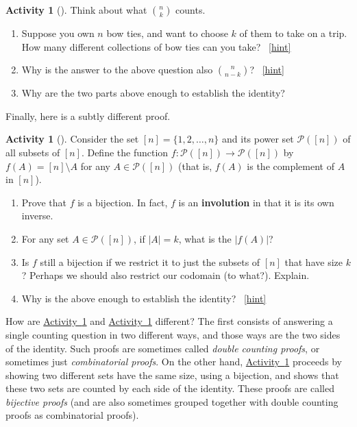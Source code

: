 \documentclass[10pt,]{book}
\newcommand{\terminology}[1]{\textbf{#1}}
\theoremstyle{plain}
\theoremstyle{definition}
\theoremstyle{definition}
\theoremstyle{definition}
\newtheorem{activity}[project]{Activity}
\numberwithin{equation}{chapter}
\def\pow{\mathcal P}
\newcommand{\card}[1]{\left| #1 \right|}
\begin{document}
\begin{activity}[]\label{act-pascalsym-dc}
\hypertarget{p-105}{}%
Think about what \(\binom{n}{k}\) counts.%
\begin{enumerate}[font=\bfseries,label=(\alph*),ref=\alph*]
\item\label{task-33} \hypertarget{p-106}{}%
Suppose you own \(n\) bow ties, and want to choose \(k\) of them to take on a trip.  How many different collections of bow ties can you take?%
~\hfill{\tiny\hyperlink{a-12.a}{[hint]}\hypertarget{q-12.a}{}}\item\label{task-34} \hypertarget{p-109}{}%
Why is the answer to the above question also \(\binom{n}{n-k}\)?%
~\hfill{\tiny\hyperlink{a-12.b}{[hint]}\hypertarget{q-12.b}{}}\item\label{task-35} \hypertarget{p-112}{}%
Why are the two parts above enough to establish the identity?%
\end{enumerate}
\end{activity}
\hypertarget{p-114}{}%
Finally, here is a subtly different proof.%
\begin{activity}[]\label{act-pascalsym-bij}
\hypertarget{p-115}{}%
Consider the set \([n] = \{1,2,\ldots,n\}\) and its power set \(\pow([n])\) of all subsets of \([n]\).  Define the function \(f:\pow([n]) \to \pow([n])\) by \(f(A) = [n]\setminus A\) for any \(A \in \pow([n])\) (that is, \(f(A)\) is the complement of \(A\) in \([n]\)).%
\begin{enumerate}[font=\bfseries,label=(\alph*),ref=\alph*]
\item\label{task-36} \hypertarget{p-116}{}%
Prove that \(f\) is a bijection.  In fact, \(f\) is an \terminology{involution} in that it is its own inverse.%
\item\label{task-37} \hypertarget{p-117}{}%
For any set \(A \in \pow([n])\), if \(\card{A} = k\), what is the \(\card{f(A)}\)?%
\item\label{task-38} \hypertarget{p-118}{}%
Is \(f\) still a bijection if we restrict it to just the subsets of \([n]\) that have size \(k\)?  Perhaps we should also restrict our codomain (to what?).  Explain.%
\item\label{task-39} \hypertarget{p-119}{}%
Why is the above enough to establish the identity?%
~\hfill{\tiny\hyperlink{a-13.d}{[hint]}\hypertarget{q-13.d}{}}\end{enumerate}
\end{activity}
\hypertarget{p-121}{}%
How are \hyperref[act-pascalsym-dc]{Activity~\ref{act-pascalsym-dc}} and \hyperref[act-pascalsym-bij]{Activity~\ref{act-pascalsym-bij}} different?  The first consists of answering a single counting question in two different ways, and those ways are the two sides of the identity.  Such proofs are sometimes called \emph{double counting proofs}, or sometimes just \emph{combinatorial proofs}.  On the other hand, \hyperref[act-pascalsym-bij]{Activity~\ref{act-pascalsym-bij}} proceeds by showing two different sets have the same size, using a bijection, and shows that these two sets are counted by each side of the identity.  These proofs are called \emph{bijective proofs} (and are also sometimes grouped together with double counting proofs as combinatorial proofs).%
\end{document}

